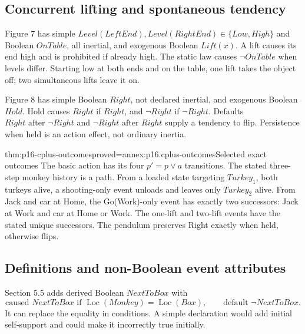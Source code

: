 \subsection{Concurrent lifting and spontaneous tendency}
Figure 7 has simple \(Level(LeftEnd),Level(RightEnd)\in\{Low,High\}\)
and Boolean \(OnTable\), all inertial, and exogenous Boolean \(Lift(x)\).
A lift causes its end high and is prohibited if already high.
The static law causes \(\neg OnTable\) when levels differ.
Starting low at both ends and on the table, one lift takes the object
off; two simultaneous lifts leave it on.

Figure 8 has simple Boolean \(Right\), not declared inertial,
and exogenous Boolean \(Hold\).
Hold causes \(Right\) if \(Right\), and \(\neg Right\) if \(\neg Right\).
Defaults \(Right\text{ after }\neg Right\) and
\(\neg Right\text{ after }Right\) supply a tendency to flip.
Persistence when held is an action effect, not ordinary inertia.

\begin{hbtheorem}{thm:p16-cplus-outcomes}{proved=annex:p16.cplus-outcomes}{Selected exact outcomes}
The basic action has its four \(p'=p\lor a\) transitions.
The stated three-step monkey history is a path.
From a loaded state targeting \(Turkey_1\), both turkeys alive, a
shooting-only event unloads and leaves only \(Turkey_2\) alive.
From Jack and car at Home, the Go(Work)-only event has exactly two
successors: Jack at Work and car at Home or Work.
The one-lift and two-lift events have the stated unique successors.
The pendulum preserves Right exactly when held, otherwise flips.
\end{hbtheorem}

\subsection{Definitions and non-Boolean event attributes}
Section 5.5 adds derived Boolean \(NextToBox\) with
\[
 \text{caused }NextToBox\text{ if }
    \operatorname{Loc}(Monkey)=\operatorname{Loc}(Box),\qquad
 \text{default }\neg NextToBox.
\]
It can replace the equality in conditions. A simple declaration would
add initial self-support and could make it incorrectly true initially.

